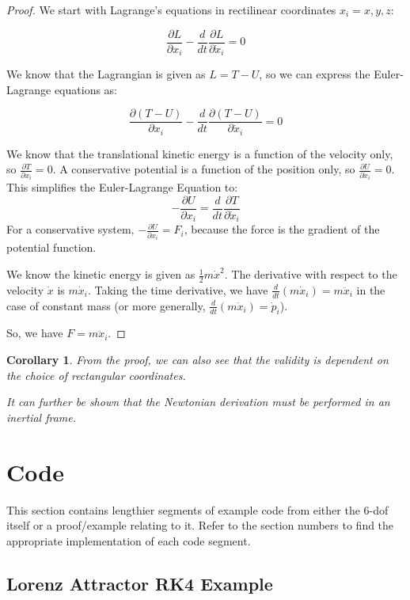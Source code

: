 \documentclass[12pt]{report}
\newtheorem{corollary}{Corollary}[theorem]
\begin{document}
\begin{proof}
We start with Lagrange's equations in rectilinear coordinates $x_i=x,y,z$:

$$\frac{\partial L}{\partial x_i}-\frac{d}{dt}\frac{\partial L}{\partial \dot{x}_i}=0 $$

We know that the \gls{Lagrangian} is given as $L=T-U$, so we can express the Euler-Lagrange equations as:

$$\frac{\partial (T-U)}{\partial x_i}-\frac{d}{dt}\frac{\partial (T-U)}{\partial \dot{x}_i}=0$$

We know that the translational kinetic energy is a function of the velocity only, so $\frac{\partial T}{\partial x_i}=0$. A conservative potential is a function of the position only, so $\frac{\partial U}{\partial \dot{x}_i}=0$. This simplifies the Euler-Lagrange Equation to:
$$-\frac{\partial U}{\partial x_i}=\frac{d}{dt}\frac{\partial T}{\partial \dot{x}_i}$$
For a conservative system, $-\frac{\partial U}{\partial x_i}=F_i$, because the force is the gradient of the potential function.

We know the kinetic energy is given as $\frac{1}{2}m\dot{x}^2$. The derivative with respect to the velocity $\dot{x}$ is $m\dot{x}_i$. Taking the time derivative, we have $\frac{d}{dt}(m\dot{x}_i)=m\ddot{x}_i$ in the case of constant mass (or more generally,  $\frac{d}{dt}(m\dot{x}_i)=\dot{p}_i$).

So, we have $F=m\ddot{x}_i$.

\end{proof}
\begin{corollary}
    From the proof, we can also see that the validity is dependent on the choice of rectangular coordinates. 

    It can further be shown that the Newtonian derivation must be performed in an inertial frame.
\end{corollary}


\section{Code}
This section contains lengthier segments of example code from either the 6-\gls{dof} itself or a proof/example relating to it. Refer to the section numbers to find the appropriate implementation of each code segment.
\subsection{Lorenz Attractor RK4 Example}\label{sec:Lorenz Attractor RK4 Example}
\label{code:Lorenz}
\end{document}
